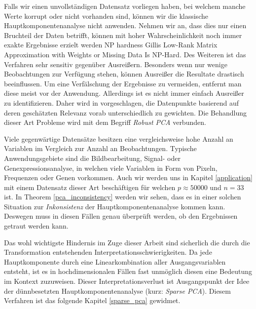 Falls wir einen unvollständigen Datensatz vorliegen haben, bei welchem manche Werte korrupt oder nicht vorhanden sind, können wir die klassische Hauptkomponentenanalyse nicht anwenden. Nehmen wir an, dass dies nur einen Bruchteil der Daten betrifft, können mit hoher Wahrscheinlichkeit noch immer exakte Ergebnisse erzielt werden \cite{candes} NP hardness Gillis Low-Rank Matrix Approximation with Weights or Missing Data Is NP-Hard. Des Weiteren ist das Verfahren sehr sensitiv gegenüber Ausreißern. Besonders wenn nur wenige Beobachtungen zur Verfügung stehen, können Ausreißer die Resultate drastisch beeinflussen. Um eine Verfälschung der Ergebnisse zu vermeiden, entfernt man diese meist vor der Anwendung. Allerdings ist es nicht immer einfach Ausreißer zu identifizieren. Daher wird in \cite{kriegel} vorgeschlagen, die Datenpunkte basierend auf deren geschätzten Relevanz vorab unterschiedlich zu gewichten. Die Behandlung dieser Art Probleme wird mit dem Begriff \textit{Robust PCA} verbunden.

Viele gegenwärtige Datensätze besitzen eine vergleichsweise hohe Anzahl an Variablen im Vergleich zur Anzahl an Beobachtungen. Typische Anwendungsgebiete sind die Bildbearbeitung, Signal- oder  Genexpressionsanalyse, in welchen viele Variablen in Form von Pixeln, Frequenzen oder Genen vorkommen. Auch wir werden uns in Kapitel \ref{application} mit einem Datensatz dieser Art beschäftigen für welchen $p \approx 50000$ und $n = 33$ ist. In Theorem \ref{pca_inconsistency} werden wir sehen, dass es in einer solchen Situation zur \textit{Inkonsistenz} der Hauptkomponentenanalyse kommen kann. Deswegen muss in diesen Fällen genau überprüft werden, ob den Ergebnissen getraut werden kann.

Das wohl wichtigste Hindernis im Zuge dieser Arbeit sind sicherlich die durch die Transformation entstehenden Interpretationsschwierigkeiten. Da jede Hauptkomponente durch eine Linearkombination aller Ausgangsvariablen entsteht, ist es in hochdimensionalen Fällen fast unmöglich diesen eine Bedeutung im Kontext zuzuweisen. Dieser Interpretationsverlust ist Ausgangspunkt der Idee der dünnbesetzten Hauptkomponentenanalyse (kurz: \textit{Sparse PCA}). Diesem Verfahren ist das folgende Kapitel \ref{sparse_pca} gewidmet.




